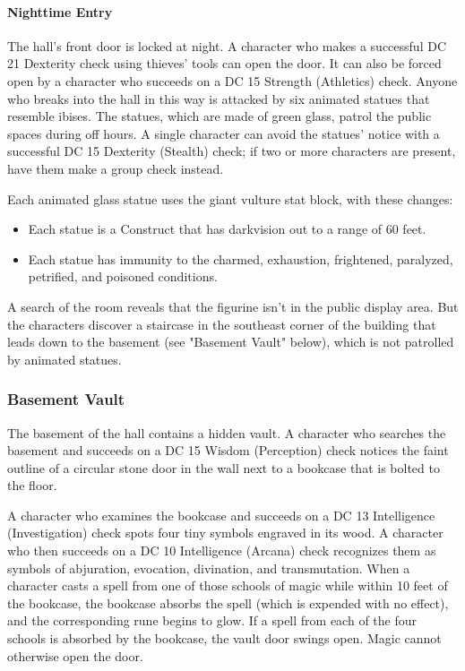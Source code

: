 \documentclass[10pt,a4paper,twoside,bg=print,twocolumn,openany,nodeprecatedcode]{dndbook}
\begin{document}
\paragraph{Nighttime Entry}
The hall's front door is locked at night. A character who makes a successful DC 21 Dexterity check using thieves' tools can open the door. It can also be forced open by a character who succeeds on a DC 15 Strength (Athletics) check. Anyone who breaks into the hall in this way is attacked by six animated statues that resemble ibises. The statues, which are made of green glass, patrol the public spaces during off hours. A single character can avoid the statues' notice with a successful DC 15 Dexterity (Stealth) check; if two or more characters are present, have them make a group check instead.

Each animated glass statue uses the giant vulture stat block, with these changes:


\begin{itemize}
\item Each statue is a Construct that has darkvision out to a range of 60 feet.
\item Each statue has immunity to the charmed, exhaustion, frightened, paralyzed, petrified, and poisoned conditions.
\end{itemize}

A search of the room reveals that the figurine isn't in the public display area. But the characters discover a staircase in the southeast corner of the building that leads down to the basement (see "Basement Vault" below), which is not patrolled by animated statues.

\subsubsection{Basement Vault}
The basement of the hall contains a hidden vault. A character who searches the basement and succeeds on a DC 15 Wisdom (Perception) check notices the faint outline of a circular stone door in the wall next to a bookcase that is bolted to the floor.

A character who examines the bookcase and succeeds on a DC 13 Intelligence (Investigation) check spots four tiny symbols engraved in its wood. A character who then succeeds on a DC 10 Intelligence (Arcana) check recognizes them as symbols of abjuration, evocation, divination, and transmutation. When a character casts a spell from one of those schools of magic while within 10 feet of the bookcase, the bookcase absorbs the spell (which is expended with no effect), and the corresponding rune begins to glow. If a spell from each of the four schools is absorbed by the bookcase, the vault door swings open. Magic cannot otherwise open the door.
\end{document}
